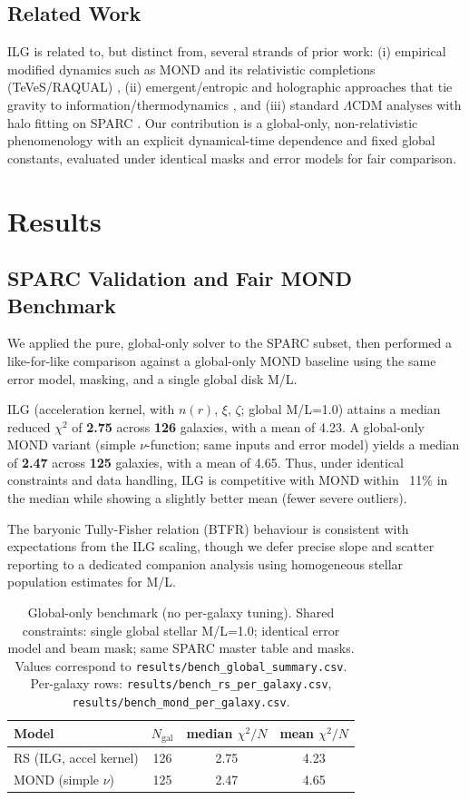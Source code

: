 \documentclass[12pt,a4paper]{article}
\begin{document}
\subsection{Related Work}
\noindent ILG is related to, but distinct from, several strands of prior work: (i) empirical modified dynamics such as MOND and its relativistic completions (TeVeS/RAQUAL) \citep{milgrom1983,bekenstein2004,famaey2012}, (ii) emergent/entropic and holographic approaches that tie gravity to information/thermodynamics \citep{verlinde2011,verlinde2017}, and (iii) standard $\Lambda$CDM analyses with halo fitting on SPARC \citep{li2018}. Our contribution is a global-only, non-relativistic phenomenology with an explicit dynamical-time dependence and fixed global constants, evaluated under identical masks and error models for fair comparison.

\section{Results}

\subsection{SPARC Validation and Fair MOND Benchmark}

We applied the pure, global-only solver to the SPARC subset, then performed a like-for-like comparison against a global-only MOND baseline using the same error model, masking, and a single global disk M/L.

ILG (acceleration kernel, with $n(r)$, $\xi$, $\zeta$; global M/L=1.0) attains a median reduced $\chi^2$ of \textbf{2.75} across \textbf{126} galaxies, with a mean of 4.23. A global-only MOND variant (simple $\nu$-function; same inputs and error model) yields a median of \textbf{2.47} across \textbf{125} galaxies, with a mean of 4.65. Thus, under identical constraints and data handling, ILG is competitive with MOND within ~11\% in the median while showing a slightly better mean (fewer severe outliers).

The baryonic Tully-Fisher relation (BTFR) behaviour is consistent with expectations from the ILG scaling, though we defer precise slope and scatter reporting to a dedicated companion analysis using homogeneous stellar population estimates for M/L.

\begin{table}[h]
\centering
\caption{Global-only benchmark (no per-galaxy tuning). Shared constraints: single global stellar M/L=1.0; identical error model and beam mask; same SPARC master table and masks. Values correspond to \texttt{results/bench\_global\_summary.csv}. Per-galaxy rows: \texttt{results/bench\_rs\_per\_galaxy.csv}, \texttt{results/bench\_mond\_per\_galaxy.csv}.}
\label{tab:global_bench}
\begin{tabular}{l c c c}
\toprule
Model & $N_\mathrm{gal}$ & median $\chi^2/N$ & mean $\chi^2/N$ \\
\midrule
RS (ILG, accel kernel) & 126 & 2.75 & 4.23 \\
MOND (simple $\nu$) & 125 & 2.47 & 4.65 \\
\bottomrule
\end{tabular}
\end{table}
\end{document}
